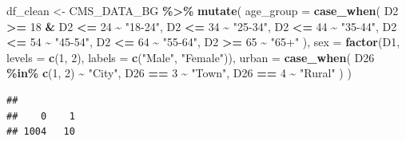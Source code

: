 \documentclass[
]{article}
\newenvironment{Shaded}{\begin{snugshade}}{\end{snugshade}}
\newcommand{\AttributeTok}[1]{\textcolor[rgb]{0.13,0.29,0.53}{#1}}
\newcommand{\CommentTok}[1]{\textcolor[rgb]{0.56,0.35,0.01}{\textit{#1}}}
\newcommand{\DecValTok}[1]{\textcolor[rgb]{0.00,0.00,0.81}{#1}}
\newcommand{\FunctionTok}[1]{\textcolor[rgb]{0.13,0.29,0.53}{\textbf{#1}}}
\newcommand{\NormalTok}[1]{#1}
\newcommand{\OtherTok}[1]{\textcolor[rgb]{0.56,0.35,0.01}{#1}}
\newcommand{\SpecialCharTok}[1]{\textcolor[rgb]{0.81,0.36,0.00}{\textbf{#1}}}
\newcommand{\StringTok}[1]{\textcolor[rgb]{0.31,0.60,0.02}{#1}}
\begin{document}
\begin{Shaded}
\begin{Highlighting}[]
\NormalTok{df\_clean }\OtherTok{\textless{}{-}}\NormalTok{ CMS\_DATA\_BG }\SpecialCharTok{\%\textgreater{}\%}
  \FunctionTok{mutate}\NormalTok{(}
    \AttributeTok{age\_group =} \FunctionTok{case\_when}\NormalTok{(}
\NormalTok{      D2 }\SpecialCharTok{\textgreater{}=} \DecValTok{18} \SpecialCharTok{\&}\NormalTok{ D2 }\SpecialCharTok{\textless{}=} \DecValTok{24} \SpecialCharTok{\textasciitilde{}} \StringTok{"18{-}24"}\NormalTok{,}
\NormalTok{      D2 }\SpecialCharTok{\textless{}=} \DecValTok{34} \SpecialCharTok{\textasciitilde{}} \StringTok{"25{-}34"}\NormalTok{,}
\NormalTok{      D2 }\SpecialCharTok{\textless{}=} \DecValTok{44} \SpecialCharTok{\textasciitilde{}} \StringTok{"35{-}44"}\NormalTok{,}
\NormalTok{      D2 }\SpecialCharTok{\textless{}=} \DecValTok{54} \SpecialCharTok{\textasciitilde{}} \StringTok{"45{-}54"}\NormalTok{,}
\NormalTok{      D2 }\SpecialCharTok{\textless{}=} \DecValTok{64} \SpecialCharTok{\textasciitilde{}} \StringTok{"55{-}64"}\NormalTok{,}
\NormalTok{      D2 }\SpecialCharTok{\textgreater{}=} \DecValTok{65} \SpecialCharTok{\textasciitilde{}} \StringTok{"65+"}
\NormalTok{    ),}
    \AttributeTok{sex =} \FunctionTok{factor}\NormalTok{(D1, }\AttributeTok{levels =} \FunctionTok{c}\NormalTok{(}\DecValTok{1}\NormalTok{, }\DecValTok{2}\NormalTok{), }\AttributeTok{labels =} \FunctionTok{c}\NormalTok{(}\StringTok{"Male"}\NormalTok{, }\StringTok{"Female"}\NormalTok{)),}
    \AttributeTok{urban =} \FunctionTok{case\_when}\NormalTok{(}
\NormalTok{      D26 }\SpecialCharTok{\%in\%} \FunctionTok{c}\NormalTok{(}\DecValTok{1}\NormalTok{, }\DecValTok{2}\NormalTok{) }\SpecialCharTok{\textasciitilde{}} \StringTok{"City"}\NormalTok{,}
\NormalTok{      D26 }\SpecialCharTok{==} \DecValTok{3} \SpecialCharTok{\textasciitilde{}} \StringTok{"Town"}\NormalTok{,}
\NormalTok{      D26 }\SpecialCharTok{==} \DecValTok{4} \SpecialCharTok{\textasciitilde{}} \StringTok{"Rural"}
\NormalTok{    )}
\NormalTok{  )}
\end{Highlighting}
\end{Shaded}

\begin{Shaded}
\end{Shaded}

\begin{verbatim}
## 
##    0    1 
## 1004   10
\end{verbatim}
\end{document}
